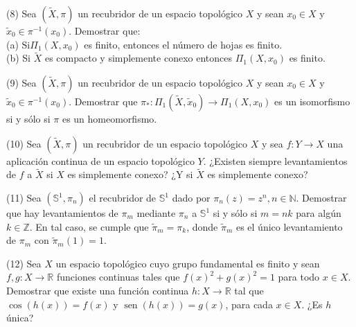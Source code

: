 \documentclass[
  a4paper,
  spanish,
  12pt,
]{scrartcl}
\begin{document}
\begin{ejer}
(8) Sea $(\widetilde{X}, \pi)$ un recubridor de un espacio topológico $X$ y sean $x_{0} \in X$ y $\widetilde{x}_{0} \in \pi^{-1}\left(x_{0}\right)$. Demostrar que:\\
(a) $\mathrm{Si} \Pi_{1}\left(X, x_{0}\right)$ es finito, entonces el número de hojas es finito.\\
(b) Si $\widetilde{X}$ es compacto y simplemente conexo entonces $\Pi_{1}\left(X, x_{0}\right)$ es finito.\\
\end{ejer}

\begin{ejer}
(9) Sea $(\widetilde{X}, \pi)$ un recubridor de un espacio topológico $X$ y sean $x_{0} \in X$ y $\widetilde{x}_{0} \in \pi^{-1}\left(x_{0}\right)$. Demostrar que $\pi_{*}: \Pi_{1}\left(\widetilde{X}, \widetilde{x}_{0}\right) \rightarrow \Pi_{1}\left(X, x_{0}\right)$ es un isomorfismo si y sólo si $\pi$ es un homeomorfismo.\\
\end{ejer}

\begin{ejer}
(10) Sea $(\widetilde{X}, \pi)$ un recubridor de un espacio topológico $X$ y sea $f: Y \rightarrow X$ una aplicación continua de un espacio topológico $Y$. ¿Existen siempre levantamientos de $f$ a $\widetilde{X}$ si $X$ es simplemente conexo? ¿Y si $\widetilde{X}$ es simplemente conexo?\\
\end{ejer}

\begin{ejer}
(11) Sea $\left(\mathbb{S}^{1}, \pi_{n}\right)$ el recubridor de $\mathbb{S}^{1}$ dado por $\pi_{n}(z)=z^{n}, n \in \mathbb{N}$. Demostrar que hay levantamientos de $\pi_{m}$ mediante $\pi_{n}$ a $\mathbb{S}^{1}$ si y sólo si $m=n k$ para algún $k \in \mathbb{Z}$. En tal caso, se cumple que $\widetilde{\pi}_{m}=\pi_{k}$, donde $\widetilde{\pi}_{m}$ es el único levantamiento de $\pi_{m}$ con $\widetilde{\pi}_{m}(1)=1$.\\
\end{ejer}

\begin{ejer}
(12) Sea $X$ un espacio topológico cuyo grupo fundamental es finito y sean $f, g: X \rightarrow \mathbb{R}$ funciones continuas tales que $f(x)^{2}+g(x)^{2}=1$ para todo $x \in X$. Demostrar que existe una función continua $h: X \rightarrow \mathbb{R}$ tal que $\cos (h(x))=f(x)$ y $\operatorname{sen}(h(x))=g(x)$, para cada $x \in X$. ¿Es $h$ única?\\
\end{ejer}
\end{document}
